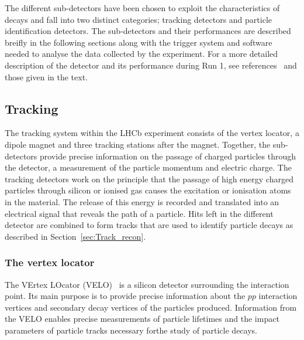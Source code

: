 The different sub-detectors have been chosen to exploit the characteristics of \bhadron decays and fall into two distinct categories; tracking detectors and particle identification detectors. The sub-detectors and their performances are described breifly in the following sections along with the trigger system and software needed to analyse the data collected by the experiment. %
For a more detailed description of the detector and its performance during Run 1, see references~\cite{Alves:2008zz,LHCb:2003ab,Aaij:2014jba} and those given in the text.




\subsection{Tracking}
\label{Tracking}

The tracking system within the LHCb experiment consists of the vertex locator, a dipole magnet and three tracking stations after the magnet. Together, the sub-detectors provide precise information on the passage of charged particles through the detector, a measurement of the particle momentum and electric charge. 
The tracking detectors work on the principle that the passage of high energy charged particles through silicon or ionised gas causes the excitation or ionisation atoms in the material. The release of this energy is recorded and translated into an electrical signal that reveals the path of a particle. 
Hits left in the different detector are combined to form tracks that are used to identify particle decays as described in Section~\ref{sec:Track_recon}.
\subsubsection{The vertex locator}
\label{VELO}
The VErtex LOcator (VELO)~\cite{Barbosa-Marinho:504321, LHCbVELOGroup:2014uea} is a silicon detector surrounding the interaction point. Its main purpose is to provide precise information about the $pp$ interaction vertices and secondary decay vertices of the particles produced. Information from the VELO enables precise measurements of particle lifetimes and the impact parameters of particle tracks necessary forthe study of particle decays. %


